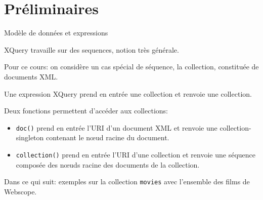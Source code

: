 



\section{Préliminaires}

\lstset{language=xquery,basicstyle=\normalsize}

\begin{frame}[allowframebreaks,t]{Modèle de données et expressions}

XQuery travaille sur des \alert{sequences}, notion très générale.

\vfill

Pour ce cours: on considère un cas spécial de séquence, la \alert{collection}, constituée de documents XML.

\vfill

Une \alert{expression} XQuery prend en entrée une collection et renvoie une collection.

\vfill

Deux fonctions permettent d'accéder aux collections: 

\begin{itemize}
  \item \lstinline!doc()! prend en entrée l'URI d'un document XML et renvoie une collection-singleton 
contenant \alert{le nœud racine} du document.

  \item \lstinline!collection()! prend en entrée l'URI d'une collection et 
renvoie une séquence composée \alert{des nœuds racine} des documents de la collection.
\end{itemize}

Dans ce qui suit: exemples sur la collection \texttt{movies} avec l'ensemble des films de Webscope.

\end{frame}


